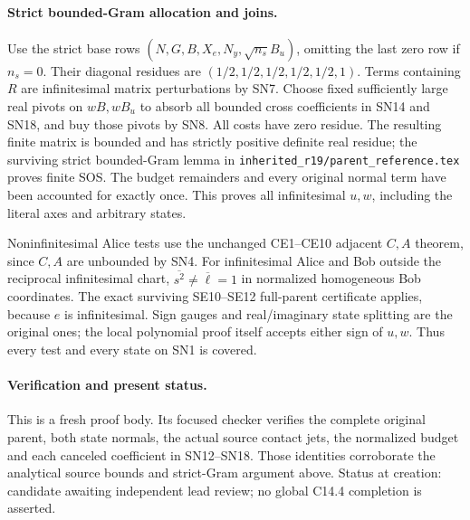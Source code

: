 \paragraph{Strict bounded-Gram allocation and joins.}
Use the strict base rows
$(N,G,B,X_e,N_y,\sqrt{n_s}B_u)$, omitting the last zero row if
$n_s=0$. Their diagonal residues are
$(1/2,1/2,1/2,1/2,1/2,1)$. Terms containing $R$ are
infinitesimal matrix perturbations by SN7. Choose fixed sufficiently
large real pivots on $wB,wB_u$ to absorb all bounded cross
coefficients in SN14 and SN18, and buy those pivots by SN8.
All costs have zero residue. The resulting finite matrix is bounded
and has strictly positive definite real residue; the surviving
strict bounded-Gram lemma in
\texttt{inherited\_r19/parent\_reference.tex} proves finite SOS.
The budget remainders and every original normal term have been
accounted for exactly once. This proves all infinitesimal $u,w$,
including the literal axes and arbitrary states.

Noninfinitesimal Alice tests use the unchanged CE1--CE10 adjacent
$C,A$ theorem, since $C,A$ are unbounded by SN4. For infinitesimal
Alice and Bob outside the reciprocal infinitesimal chart,
$\overline{s^2}\ne\overline\ell=1$ in normalized homogeneous
Bob coordinates. The exact surviving SE10--SE12 full-parent
certificate applies, because $e$ is infinitesimal. Sign gauges and
real/imaginary state splitting are the original ones; the local
polynomial proof itself accepts either sign of $u,w$. Thus every
test and every state on SN1 is covered.

\paragraph{Verification and present status.}
This is a fresh proof body. Its focused checker verifies the complete
original parent, both state normals, the actual source contact jets,
the normalized budget and each canceled coefficient in SN12--SN18.
Those identities corroborate the analytical source bounds and
strict-Gram argument above. Status at creation: candidate awaiting
independent lead review; no global C14.4 completion is asserted.
